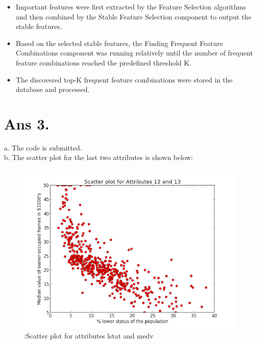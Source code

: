 \documentclass[10pt]{article}
\begin{document}
\begin{flushleft}
\begin{itemize}
\item Important features were first extracted by the Feature Selection algorithms and then combined by the Stable Feature Selection component to output the stable features.
\item Based on the selected stable features, the Finding Frequent Feature Combinations component was running relatively until the number of frequent feature combinations reached the predefined threshold K.
\item The discovered top-K frequent feature combinations were stored in the database and processed.
\end{itemize}
\end{flushleft}
\section*{Ans 3.}
\begin{flushleft}
a. The code is submitted.\\
\vspace{1em}
b. The scatter plot for the last two attributes is shown below:\\
\begin{figure}[!htb]
\includegraphics{scatter}
\caption{:Scatter plot for attributes lstat and medv}   
\label{fig::Scatter plot for attributes lstat and medv} 
\end{figure}
\end{flushleft}
\end{document}
